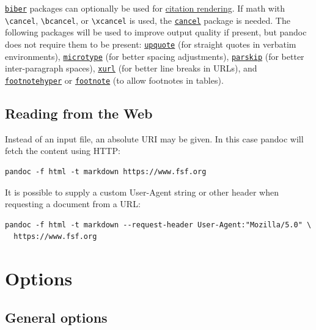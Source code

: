 \documentclass[
]{article}
\begin{document}
\href{https://ctan.org/pkg/biber}{\texttt{biber}} packages can
optionally be used for \protect\hyperlink{citation-rendering}{citation
rendering}. If math with \texttt{\textbackslash{}cancel},
\texttt{\textbackslash{}bcancel}, or \texttt{\textbackslash{}xcancel} is
used, the \href{https://ctan.org/pkg/cancel}{\texttt{cancel}} package is
needed. The following packages will be used to improve output quality if
present, but pandoc does not require them to be present:
\href{https://ctan.org/pkg/upquote}{\texttt{upquote}} (for straight
quotes in verbatim environments),
\href{https://ctan.org/pkg/microtype}{\texttt{microtype}} (for better
spacing adjustments),
\href{https://ctan.org/pkg/parskip}{\texttt{parskip}} (for better
inter-paragraph spaces), \href{https://ctan.org/pkg/xurl}{\texttt{xurl}}
(for better line breaks in URLs), and
\href{https://ctan.org/pkg/footnotehyper}{\texttt{footnotehyper}} or
\href{https://ctan.org/pkg/footnote}{\texttt{footnote}} (to allow
footnotes in tables).

\hypertarget{reading-from-the-web}{%
\subsection{Reading from the Web}\label{reading-from-the-web}}

Instead of an input file, an absolute URI may be given. In this case
pandoc will fetch the content using HTTP:

\begin{verbatim}
pandoc -f html -t markdown https://www.fsf.org
\end{verbatim}

It is possible to supply a custom User-Agent string or other header when
requesting a document from a URL:

\begin{verbatim}
pandoc -f html -t markdown --request-header User-Agent:"Mozilla/5.0" \
  https://www.fsf.org
\end{verbatim}

\hypertarget{options}{%
\section{Options}\label{options}}

\hypertarget{general-options}{%
\subsection{General options}\label{general-options}}
\end{document}
